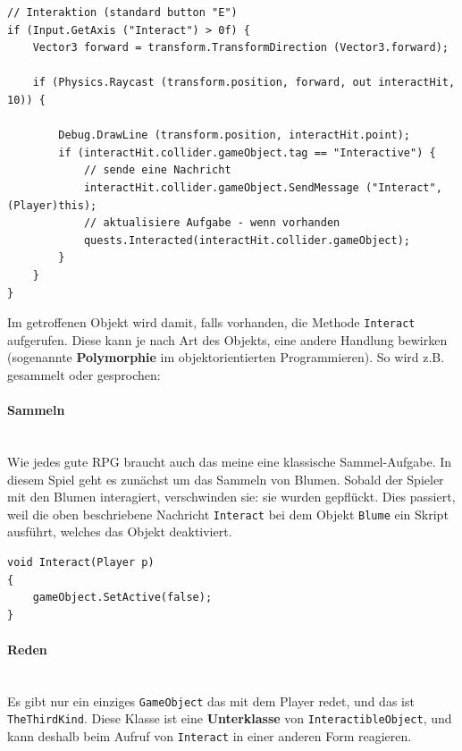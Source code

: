 \begin{lstlisting}[caption={Auslösen der Interaktion}]
// Interaktion (standard button "E")
if (Input.GetAxis ("Interact") > 0f) {
	Vector3 forward = transform.TransformDirection (Vector3.forward);

	if (Physics.Raycast (transform.position, forward, out interactHit, 10)) {	
		
		Debug.DrawLine (transform.position, interactHit.point);
		if (interactHit.collider.gameObject.tag == "Interactive") {
			// sende eine Nachricht
			interactHit.collider.gameObject.SendMessage ("Interact", (Player)this);
			// aktualisiere Aufgabe - wenn vorhanden
			quests.Interacted(interactHit.collider.gameObject);
		}
	}	
}
\end{lstlisting}

Im getroffenen Objekt wird damit, falls vorhanden, die Methode \lstinline{Interact} aufgerufen. Diese kann je nach Art des Objekts, eine andere Handlung bewirken (sogenannte \textbf{Polymorphie} im objektorientierten Programmieren). So wird z.B. gesammelt oder gesprochen:

\paragraph{Sammeln}\mbox{} \\
Wie jedes gute RPG braucht auch das meine eine klassische Sammel-Aufgabe.
In diesem Spiel geht es zunächst um das Sammeln von Blumen. Sobald der Spieler mit den Blumen interagiert, verschwinden sie: sie wurden gepflückt.
Dies passiert, weil die oben beschriebene Nachricht \lstinline{Interact} bei dem Objekt \lstinline{Blume} ein Skript ausführt, welches das Objekt deaktiviert.
\begin{lstlisting}[caption={Standardimplementation von Interact}]
void Interact(Player p)
{
	gameObject.SetActive(false);
}
\end{lstlisting}
 
\paragraph{Reden}\mbox{} \\
Es gibt nur ein einziges \lstinline{GameObject} das mit dem Player redet, und das ist \lstinline{TheThirdKind}. Diese Klasse ist eine \textbf{Unterklasse} von \lstinline{InteractibleObject}, und kann deshalb beim Aufruf von \lstinline{Interact} in einer anderen Form reagieren.

